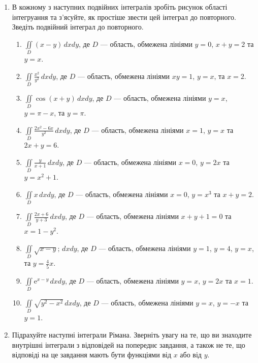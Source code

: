 \begin{enumerate}
    \item\label{problem:measurable_sets:self_control:double:reduction} В кожному з наступних подвійних інтегралів зробіть рисунок області інтегруання та з'ясуйте, як простіше звести цей інтеграл до повторного. Зведіть подвійний інтеграл до повторного.
    \begin{enumerate}[label*=\arabic*.]
        \item $\iint\limits_D (x - y) \, d x d y$, де $D$ --- область, обмежена лініями $y = 0$, $x + y = 2$ та $y = x$.

        \item $\iint\limits_D \frac{x^{2}}{y^{2}} \, d x d y$, де $D$ --- область, обмежена лініями $x y = 1$, $y = x$, та $x = 2$.

        \item $\iint\limits_D \cos\left(x+y\right) \, d x d y$, де $D$ --- область, обмежена лініями $y = x$, $y = \pi - x$, та $y = \pi$.

        \item $\iint\limits_D \frac{2x^{2}-6 x}{y^{2}} \, d x d y$, де $D$ --- область, обмежена лініями $x = 1$, ${y = x}$ та ${2 x + y = 6}$.

        \item $\iint\limits_D \frac{y}{x+1} \, d x d y$, де $D$ --- область, обмежена лініями $x = 0$, ${y = 2 x}$ та ${y = x^2 + 1}$.

        \item $\iint\limits_D x \, d x d y$, де $D$ --- область, обмежена лініями $x = 0$, ${y = x^3}$ та ${x + y = 2}$.

        \item $\iint\limits_D \frac{2 x+6}{y+3} \, d x d y$, де $D$ --- область, обмежена лініями ${x + y + 1 = 0}$ та ${x = 1 - y^2}$.

        \item $\iint\limits_D  \sqrt{x -y}; \, d x d y$, де $D$ --- область, обмежена лініями $y = 1$, $y = 4$, $y = x$, та $y = \frac{4}{5}x$.

        \item $\iint\limits_D {\mathrm e}^{x-y} \, d x d y$, де $D$ --- область, обмежена лініями ${y = x}$, ${ y = 2 x}$ та $x = 1$.

        \item $\iint\limits_D \sqrt{y^{2}-x^{2}} \, d x d y$, де $D$ --- область, обмежена лініями ${y = x}$, ${y = -x}$ та ${y = 1}$.
    \end{enumerate}
    \item\label{problem:measurable_sets:self_control:double:inner} Підрахуйте наступні інтеграли Рімана. Зверніть увагу на те, що ви знаходите внутрішні інтеграли з відповідей на попереднє завдання, а також не те, що відповіді на це завдання мають бути функціями від $x$ або від $y$.
    \begin{enumerate}[label*=\arabic*.]
\end{enumerate}
\end{enumerate}
